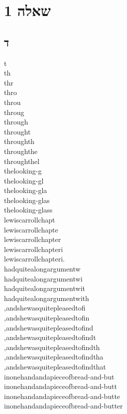 \documentclass{article}
\begin{document}
\section*{שאלה 1}

\subsection*{ד}
t\\
th\\
thr\\
thro\\
throu\\
throug\\
through\\
throught\\
throughth\\
throughthe\\
throughthel\\
thelooking-g\\
thelooking-gl\\
thelooking-gla\\
thelooking-glas\\
thelooking-glass\\
lewiscarrollchapt\\
lewiscarrollchapte\\
lewiscarrollchapter\\
lewiscarrollchapteri\\
lewiscarrollchapteri.\\
hadquitealongargumentw\\
hadquitealongargumentwi\\
hadquitealongargumentwit\\
hadquitealongargumentwith\\
,andshewasquitepleasedtofi\\
,andshewasquitepleasedtofin\\
,andshewasquitepleasedtofind\\
,andshewasquitepleasedtofindt\\
,andshewasquitepleasedtofindth\\
,andshewasquitepleasedtofindtha\\
,andshewasquitepleasedtofindthat\\
inonehandandapieceofbread-and-but\\
inonehandandapieceofbread-and-butt\\
inonehandandapieceofbread-and-butte\\
inonehandandapieceofbread-and-butter\\
\end{document}

